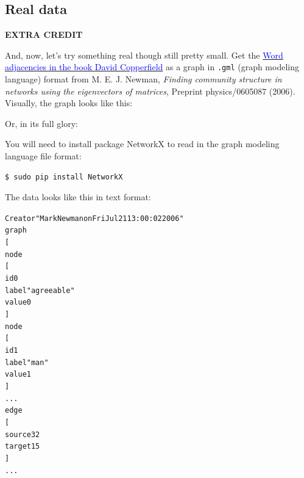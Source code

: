\begin{fullwidth}
\section{Real data}

{\bf EXTRA CREDIT}

And, now, let's try something real though still pretty small. Get the \href{http://www-personal.umich.edu/~mejn/netdata/adjnoun.zip}{\textcolor{blue}{Word adjacencies in the book David Copperfield}} as a graph in {\tt .gml} (graph modeling language) format from M. E. J. Newman, {\em Finding community structure in networks using the eigenvectors of matrices}, Preprint physics/0605087 (2006). Visually, the graph looks like this:

\begin{center}
\end{center}

\noindent Or, in its full glory:

\begin{center}
\end{center}

You will need to install package NetworkX to read in the graph modeling language file format:

\begin{lstlisting}[style=BashInputStyle]
$ sudo pip install NetworkX
\end{lstlisting}

\noindent The data looks like this in text format:

\begin{alltt}\small
Creator "Mark Newman on Fri Jul 21 13:00:02 2006"
graph
[
  node
  [
    id 0
    label "agreeable"
    value 0
  ]
  node
  [
    id 1
    label "man"
    value 1
  ]
...
  edge
  [
    source 32
    target 15
  ]
...
\end{alltt}


\end{fullwidth}
